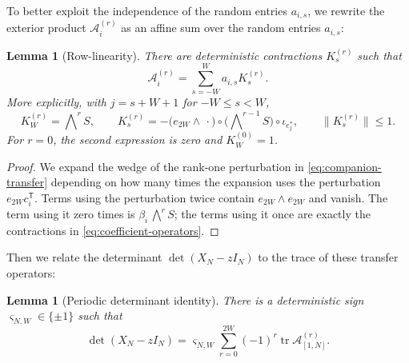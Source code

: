 \documentclass[11pt,reqno]{amsart}
\numberwithin{equation}{section}
\newtheorem{lemma}[theorem]{Lemma}
\theoremstyle{definition}
\theoremstyle{remark}
\newcommand{\1}{\mathbf 1}
\DeclareMathOperator{\tr}{tr}
\begin{document}
To better exploit the independence of the random entries $a_{i,s}$, we rewrite the exterior product $\mathcal A_i^{(r)}$ as an affine sum over the random entries $a_{i,s}$:
\begin{lemma}[Row-linearity]\label{lem:row-linearity}
There are deterministic contractions $K_s^{(r)}$ such that
\begin{equation}\label{eq:row-linear-exterior}
 \mathcal A_i^{(r)}=\sum_{s=-W}^W a_{i,s}K_s^{(r)}.
\end{equation}
More explicitly, with $j=s+W+1$ for $-W\le s<W$,
\begin{equation}\label{eq:coefficient-operators}
 K_W^{(r)}=\bigwedge\nolimits^rS,\qquad
 K_s^{(r)}=-\big(e_{2W}\wedge\,\cdot\big)\circ
 \big(\bigwedge\nolimits^{r-1}S\big)\circ\iota_{e_j^*},\qquad
 \|K_s^{(r)}\|\le1.
\end{equation}
For $r=0$, the second expression is zero and $K_W^{(0)}=1$.
\end{lemma}

\begin{proof}
We expand the wedge of the rank-one perturbation in
\eqref{eq:companion-transfer} depending on how many times the expansion uses the perturbation $e_{2W}c_i^{\mathsf T}$.  Terms using the perturbation twice contain
$e_{2W}\wedge e_{2W}$ and vanish.  The term using it zero times is
$\beta_i\,\bigwedge\nolimits^rS$; the terms using it once are exactly the
contractions in
\eqref{eq:coefficient-operators}.
\end{proof}


Then we relate the determinant $\det(X_N-zI_N)$ to the trace of these transfer operators:
\begin{lemma}[Periodic determinant identity]\label{lem:periodic-det}
There is a deterministic sign $\varsigma_{N,W}\in\{\pm1\}$ such that
\begin{equation}\label{eq:periodic-det}
 \det(X_N-zI_N)=\varsigma_{N,W}
 \sum_{r=0}^{2W}(-1)^r\tr\mathcal A_{[1,N]}^{(r)}.
\end{equation}
\end{lemma}
\end{document}
